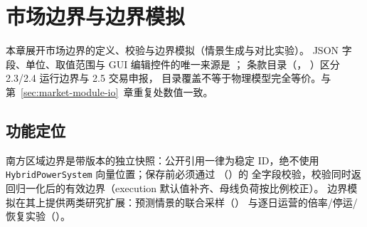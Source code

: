 \section{市场边界与边界模拟}\label{sec:market-boundary}

\begin{theorynote}
本章展开市场边界的定义、校验与边界模拟（情景生成与对比实验）。
JSON 字段、单位、取值范围与 GUI 编辑控件的唯一来源是
；
条款目录（，
）区分 2.3/2.4 运行边界与 2.5 交易申报，
目录覆盖不等于物理模型完全等价。与第~\ref{sec:market-module-io}~章重复处数值一致。
\end{theorynote}

\subsection{功能定位}
南方区域边界是带版本的独立快照：公开引用一律为稳定 ID，绝不使用
\texttt{HybridPowerSystem} 向量位置；保存前必须通过
（）的
全字段校验，校验同时返回归一化后的有效边界（execution 默认值补齐、母线负荷按比例校正）。
边界模拟在其上提供两类研究扩展：预测情景的联合采样（）
与逐日运营的倍率/停运/恢复实验（）。

